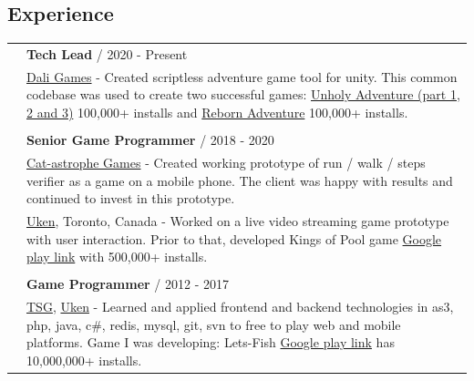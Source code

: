 \documentclass[12pt,a4paper]{article}
\begin{document}
\begin{multicols}{2}

\section*{Experience }

	\begin{tabular}{ >{\RaggedLeft}p{0cm}   p{8.5cm}  } 
 
		&  \textbf{Tech Lead} / 2020 - Present \\
		&  \hspace{5mm}  {\href{https://dali.games/}{Dali Games}} - Created scriptless adventure game tool for unity. This common codebase was used to create two successful games: {\href{https://play.google.com/store/apps/details?id=games.dali.adventure.neighborhood.unholy}{Unholy Adventure (part 1, 2 and 3)}} 100,000+ installs and {\href{https://play.google.com/store/apps/details?id=games.dali.adventure.reborn}{Reborn Adventure}} 100,000+ installs.   \\

		& \\

		 & \textbf{Senior Game Programmer} / 2018 - 2020  \\
		& \hspace{5mm} {\href{https://cat-astrophe-games.com/}{Cat-astrophe Games}} - Created working prototype of run / walk / steps verifier as a game on a mobile phone. The client was happy with results and continued to invest in this prototype.  \\

		& \hspace{5mm} {\href{https://www.uken.com/}{Uken}}, Toronto, Canada  - Worked on a live video streaming game prototype with user interaction. Prior to that, developed Kings of Pool game {\href{https://play.google.com/store/apps/details?id=com.uken.pool}{Google play link}} with  500,000+ installs.  \\

		& \\
		&  \textbf{Game Programmer} / 2012 - 2017 \\ 
		& \hspace{5mm} {\href{https://tensquaregames.com/}{TSG}}, {\href{https://www.uken.com/}{Uken}} - Learned and applied frontend and backend technologies in as3, php, java, c\#, redis, mysql, git, svn to free to play web and mobile platforms. Game I was developing: Lets-Fish {\href{https://play.google.com/store/apps/details?id=air.com.tensquaregames.letsfish}{Google play link}} has 10,000,000+ installs.    \\	 


\end{tabular}
\end{multicols}
\end{document}
